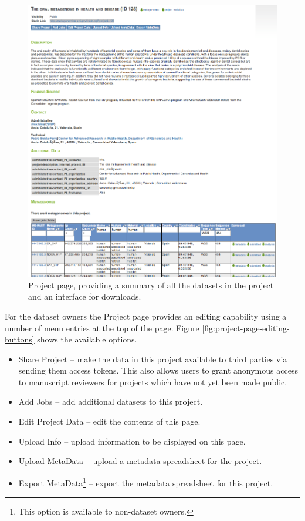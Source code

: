 \documentclass[12pt,fullpage]{report}
\begin{document}
\begin{figure}
\begin{center}
\includegraphics[width=6in]{Images/project-page.png}
\end{center}
\caption{
Project page, providing a summary of all the datasets in the project and an interface for downloads.
}
\label{fig:project-page}
\end{figure}

For the dataset owners the Project page provides an editing capability using a number of menu entries at the top of the page. Figure \ref{fig:project-page-editing-buttons} shows the available options.

\begin{itemize}
\item Share Project --
make the data in this project available to third parties via sending them access tokens. This also allows users to grant anonymous access to manuscript reviewers for projects which have not yet been made public.

\item Add Jobs --
add additional datasets to this project.

\item Edit Project Data --
edit the contents of this page.

\item Upload Info --
upload information to be displayed on this page.

\item Upload MetaData --
upload a metadata spreadsheet for the project.

\item Export MetaData\footnote{This option is available to non-dataset owners.} --
export the metadata spreadsheet for this project.

\end{itemize}
\end{document}

